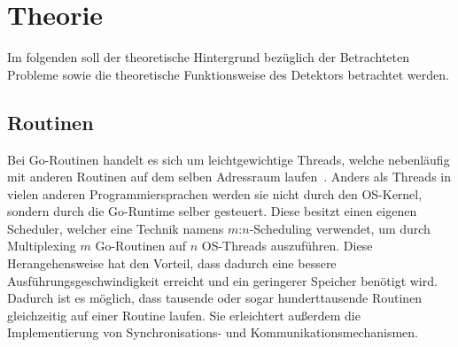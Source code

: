 \chapter{Theorie}\label{chap:background}
Im folgenden soll der theoretische Hintergrund bezüglich der 
Betrachteten Probleme sowie die theoretische Funktionsweise des 
Detektors betrachtet werden. 

\section{Routinen}\label{Chap:Back-Sec:Routine}
Bei Go-Routinen handelt es sich um leichtgewichtige Threads, welche 
nebenläufig mit anderen Routinen auf dem selben Adressraum laufen~\cite{effectiveGo}.
Anders als Threads in vielen anderen Programmiersprachen werden sie nicht 
durch den OS-Kernel, sondern durch die Go-Runtime selber gesteuert.
Diese besitzt einen eigenen Scheduler, welcher eine Technik namens $m$:$n$-Scheduling 
verwendet, um durch Multiplexing $m$ Go-Routinen auf $n$ OS-Threads auszuführen.
Diese Herangehensweise hat den Vorteil, dass dadurch eine bessere Ausführungsgeschwindigkeit 
erreicht und ein geringerer Speicher benötigt wird. Dadurch ist 
es möglich, dass tausende oder sogar hunderttausende Routinen gleichzeitig 
auf einer Routine laufen. Sie erleichtert außerdem 
die Implementierung von Synchronisations- und Kommunikationsmechanismen.


